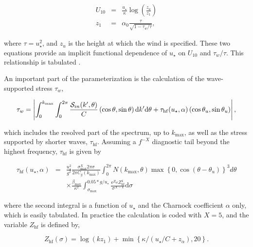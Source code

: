 \begin{eqnarray}
U_{10}&=&\frac{u_\star}{\kappa} \log\left(\frac{z_u}{z_1}\right) \\
z_1&=&\alpha_0 \frac{\tau}{ \sqrt{1-\tau_w/\tau}},
\end{eqnarray}

\noindent
where $\tau=u_\star^2$, and $z_u$ is the height at which the wind is
specified. These two equations provide an implicit functional dependence of
$u_\star$ on $U_{10}$ and $\tau_w/\tau$. This relationship is tabulated
\citep{art:Jan91, rep:Bea07}.

An important part of the parameterization is the calculation of the
wave-supported stress $\tau_w$,

\begin{equation}
\tau_w=\left|\int_0^{k_{\max}} \int_0^{2 \pi} \frac{{\cal S}_{in}(k',\theta)}{C}
\left(\cos \theta, \sin \theta \right)  {\mathrm d} k' \mathrm d \theta +
\tau_{\mathrm{hf}}(u_\star,\alpha) \left(\cos \theta_u, \sin \theta_u \right)
\right|,\label{eq:tauwint}
\end{equation}

\noindent
which includes the resolved part of the spectrum, up to $k_{\max}$, as well as
the stress supported by shorter waves, $\tau_{\mathrm{hf}}$. Assuming a
$f^{-X}$ diagnostic tail beyond the highest frequency, $\tau_{\mathrm{hf}}$ is
given by

\begin{eqnarray}
\tau_{\mathrm{hf}}(u_\star,\alpha)&= &\frac{u_{\star}^2}{g^2}
\frac{\sigma_{\max}^X 2 \pi \sigma }{2 \pi C_g(k_{\max})} \int_0^{2 \pi} N
\left(k_{\max},\theta \right)
\max\left\{0,\cos\left(\theta-\theta_u\right)\right\}^3 d \theta \nonumber \\
& & \times \frac{\beta_{\mathrm{max}}}{\kappa^2}
\int_{\sigma_{\max}}^{0.05*g/u_\star} \frac{{\mathrm
e}^{Z_{\mathrm{hf}}}Z_{\mathrm{hf}}^4}{\sigma^{X-4}} {\mathrm d} \sigma
\label{eq:tauhfint}
\end{eqnarray}

\noindent
where the second integral is a function of $u_\star$ and the Charnock
coefficient $\alpha$ only, which is easily tabulated. In practice the
calculation is coded with $X=5$, and the variable $Z_{\mathrm{hf}}$ is defined
by,

\begin{equation}
Z_{\mathrm{hf}}(\sigma)=\log(k z_1)+\min\left\{\kappa/\left(u_\star/C +
z_\alpha \right),20\right\}.
\end{equation}


